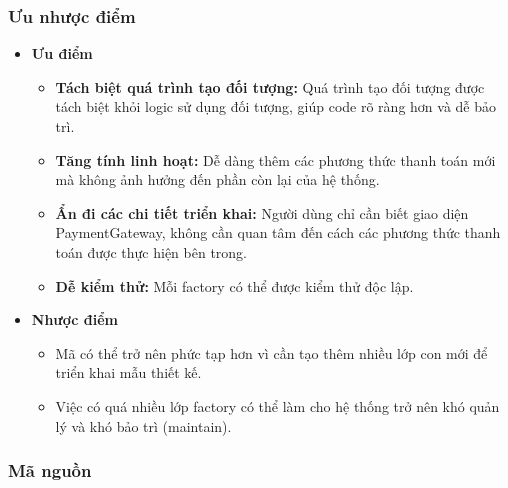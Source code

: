 \subsubsection{Ưu nhược điểm}
\begin{flushleft}
    \begin{itemize}
        \item \textbf{Ưu điểm}
              \begin{itemize}
                  \item \textbf{Tách biệt quá trình tạo đối tượng:} Quá trình tạo đối tượng được tách biệt khỏi logic sử dụng đối tượng, giúp code rõ ràng hơn và dễ bảo trì.
                  \item \textbf{Tăng tính linh hoạt:} Dễ dàng thêm các phương thức thanh toán mới mà không ảnh hưởng đến phần còn lại của hệ thống.
                  \item \textbf{Ẩn đi các chi tiết triển khai:} Người dùng chỉ cần biết giao diện PaymentGateway, không cần quan tâm đến cách các phương thức thanh toán được thực hiện bên trong.
                  \item \textbf{Dễ kiểm thử:} Mỗi factory có thể được kiểm thử độc lập.
              \end{itemize}
        \item \textbf{Nhược điểm}
              \begin{itemize}
                  \item Mã có thể trở nên phức tạp hơn vì cần tạo thêm nhiều lớp con mới để triển khai mẫu thiết kế.
                  \item Việc có quá nhiều lớp factory có thể làm cho hệ thống trở nên khó quản lý và khó bảo trì (maintain).
              \end{itemize}
    \end{itemize}
\end{flushleft}

\subsubsection{Mã nguồn}
